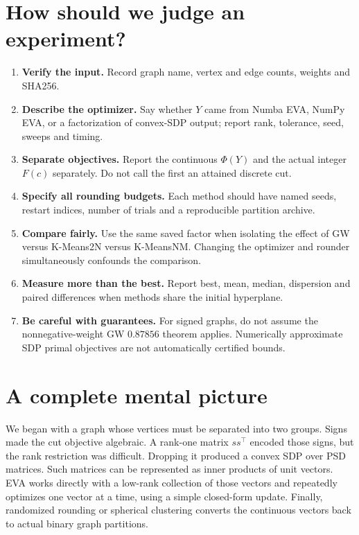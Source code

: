 \documentclass[10pt,letterpaper]{article}
\newcommand{\explain}[1]{{\color{MeanGreen}\textbf{#1}}}
\begin{document}
\section{How should we judge an experiment?}
\label{sec:judgement}
\begin{enumerate}
\item \explain{Verify the input.} Record graph name, vertex and edge counts, weights and SHA256.
\item \explain{Describe the optimizer.} Say whether $Y$ came from Numba EVA, NumPy EVA, or a factorization of convex-SDP output; report rank, tolerance, seed, sweeps and timing.
\item \explain{Separate objectives.} Report the continuous $\Phi(Y)$ and the actual integer $F(c)$ separately. Do not call the first an attained discrete cut.
\item \explain{Specify all rounding budgets.} Each method should have named seeds, restart indices, number of trials and a reproducible partition archive.
\item \explain{Compare fairly.} Use the same saved factor when isolating the effect of GW versus K-Means2N versus K-MeansNM. Changing the optimizer and rounder simultaneously confounds the comparison.
\item \explain{Measure more than the best.} Report best, mean, median, dispersion and paired differences when methods share the initial hyperplane.
\item \explain{Be careful with guarantees.} For signed graphs, do not assume the nonnegative-weight GW $0.87856$ theorem applies. Numerically approximate SDP primal objectives are not automatically certified bounds.
\end{enumerate}

\section{A complete mental picture}
\label{sec:summary}
We began with a graph whose vertices must be separated into two groups. Signs made the cut objective algebraic. A rank-one matrix $ss^\top$ encoded those signs, but the rank restriction was difficult. Dropping it produced a convex SDP over PSD matrices. Such matrices can be represented as inner products of unit vectors. EVA works directly with a low-rank collection of those vectors and repeatedly optimizes one vector at a time, using a simple closed-form update. Finally, randomized rounding or spherical clustering converts the continuous vectors back to actual binary graph partitions.
\end{document}
